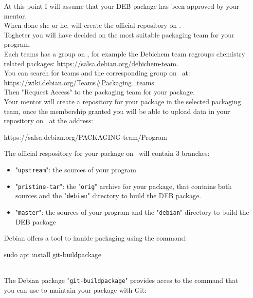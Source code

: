 At this point I will assume that your DEB package has been approved by your mentor. \\
When done she or he, will create the official repository on \salsa. \\ 
Togheter you will have decided on the most suitable packaging team for your program. \\ 
Each teams has a group on \salsa, for example the Debichem team  
regroups chemistry related packages: \href{https://salsa.debian.org/debichem-team}{https://salsa.debian.org/debichem-team}. \\[0.25cm]
You can search for teams and the corresponding group on \salsa\ at: \\[0.25cm]
\href{https://wiki.debian.org/Teams\#Packaging\_teams}{https://wiki.debian.org/Teams\#Packaging\_teams} \\[0.25cm]
Then "Request Access" to the packaging team for your package. \\[0.25cm]
Your mentor will create a repository for your package in the selected packaging team, once the membership granted you will be able 
to upload data in your repository on \salsa\ at the address:
\begin{center}https://salsa.debian.org/PACKAGING-team/Program\end{center}
The official respository for your package on \salsa\ will contain 3 branches:
\begin{itemize}
\item "\texttt{upstream}": the sources of your program
\item "\texttt{pristine-tar}": the "\texttt{orig}" archive for your package, that contains both sources and the "\texttt{debian}" directory to build the DEB package. 
\item "\texttt{master}": the sources of your program and the "\texttt{debian}" directory to build the DEB package
\end{itemize}
Debian offers a tool to hanlde packaging using the  command:
\begin{script}
\uprompt{~} sudo apt install git-buildpackage
\end{script}\\[-0.5cm]
\noindent The Debian package "\texttt{git-buildpackage}" provides acces to the  command that you can use to maintain your package with Git:
